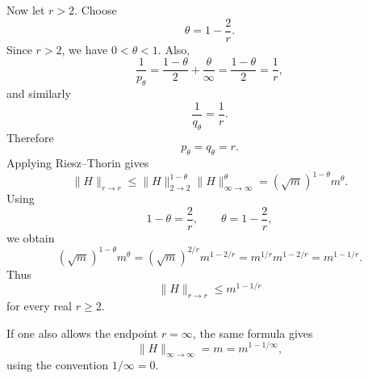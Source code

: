 Now let \(r>2\). Choose
\[
\theta=1-\frac{2}{r}.
\]
Since \(r>2\), we have \(0<\theta<1\). Also,
\[
\frac1{p_\theta}
=
\frac{1-\theta}{2}
+
\frac{\theta}{\infty}
=
\frac{1-\theta}{2}
=
\frac1r,
\]
and similarly
\[
\frac1{q_\theta}
=
\frac1r.
\]
Therefore
\[
p_\theta=q_\theta=r.
\]
Applying Riesz--Thorin gives
\[
\|H\|_{r\to r}
\le
\|H\|_{2\to 2}^{1-\theta}
\|H\|_{\infty\to\infty}^{\theta}
=
(\sqrt m)^{1-\theta}m^\theta.
\]
Using
\[
1-\theta=\frac{2}{r},
\qquad
\theta=1-\frac{2}{r},
\]
we obtain
\[
(\sqrt m)^{1-\theta}m^\theta
=
(\sqrt m)^{2/r}m^{1-2/r}
=
m^{1/r}m^{1-2/r}
=
m^{1-1/r}.
\]
Thus
\[
\boxed{\|H\|_{r\to r}\le m^{1-1/r}}
\]
for every real \(r\ge 2\).

If one also allows the endpoint \(r=\infty\), the same formula gives
\[
\|H\|_{\infty\to\infty}=m=m^{1-1/\infty},
\]
using the convention \(1/\infty=0\).